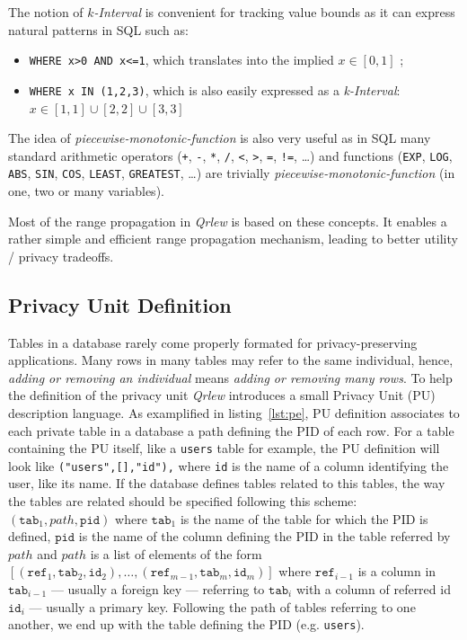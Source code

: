 \documentclass[letterpaper]{article} %
\newcommand{\qrlew}{\emph{Qrlew}}
\begin{document}
The notion of \emph{$k$-Interval} is convenient for tracking value bounds as it can express natural patterns in SQL such as:
\begin{itemize}
    \item \texttt{WHERE x>0 AND x<=1}, which translates into the implied $x\in \left[0, 1\right]$ ;
    \item \texttt{WHERE x IN (1,2,3)}, which is also easily expressed as a \emph{k-Interval}: $x \in \left[1, 1\right] \cup \left[2, 2\right] \cup \left[3, 3\right]$
\end{itemize}

The idea of \emph{piecewise-monotonic-function} is also very useful as in SQL many standard arithmetic operators (\texttt{+}, \texttt{-}, \texttt{*}, \texttt{/}, \texttt{<}, \texttt{>}, \texttt{=}, \texttt{!=}, \ldots) and functions (\texttt{EXP}, \texttt{LOG}, \texttt{ABS}, \texttt{SIN}, \texttt{COS}, \texttt{LEAST}, \texttt{GREATEST}, \ldots) are trivially \emph{piecewise-monotonic-function} (in one, two or many variables).

Most of the range propagation in \qrlew{} is based on these concepts. It enables a rather simple and efficient range propagation mechanism, leading to better utility / privacy tradeoffs.

\subsection{Privacy Unit Definition}
\label{sec:privacy_unit_definition}

Tables in a database rarely come properly formated for privacy-preserving applications. Many rows in many tables may refer to the same individual, hence, \emph{adding or removing an individual} means \emph{adding or removing many rows}. To help the definition of the privacy unit \qrlew{} introduces a small Privacy Unit (PU) description language.
As examplified in listing~\ref{lst:pe}, PU definition associates to each private table in a database a path defining the PID of each row. For a table containing the PU itself, like a \texttt{users} table for example, the PU definition will look like \texttt{("users",[],"id"),} where \texttt{id} is the name of a column identifying the user, like its name. If the database defines tables related to this tables, the way the tables are related should be specified following this scheme: $(\mathtt{tab}_1, path, \mathtt{pid})$ where $\mathtt{tab}_1$ is the name of the table for which the PID is defined, $\mathtt{pid}$ is the name of the column defining the PID in the table referred by $path$ and $path$ is a list of elements of the form $[(\mathtt{ref}_1, \mathtt{tab}_2, \mathtt{id}_2),\ldots, (\mathtt{ref}_{m-1}, \mathtt{tab}_m, \mathtt{id}_m)]$
where $\mathtt{ref}_{i-1}$ is a column in $\mathtt{tab}_{i-1}$ --- usually a foreign key --- referring to $\mathtt{tab}_i$ with a column of referred id $\mathtt{id}_i$ --- usually a primary key. Following the path of tables referring to one another, we end up with the table defining the PID (e.g. \texttt{users}).
\end{document}
